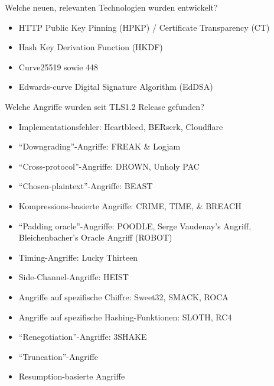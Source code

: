 \documentclass{f4_beamer_metropolis}
\begin{document}
\begin{frame}{Welche neuen, relevanten Technologien wurden entwickelt?}
  \begin{itemize}
    \item HTTP Public Key Pinning (HPKP) / Certificate Transparency (CT)
    \item Hash Key Derivation Function (HKDF)
    \item Curve25519 sowie 448
    \item Edwards-curve Digital Signature Algorithm (EdDSA)
  \end{itemize}

  \end{frame}

\begin{frame}{Welche Angriffe wurden seit TLS1.2 Release gefunden?}
  \begin{itemize}
    \item Implementationsfehler: Heartbleed, BERserk, Cloudflare
    \item \enquote{Downgrading}-Angriffe: FREAK \& Logjam
    \item \enquote{Cross-protocol}-Angriffe: DROWN, Unholy PAC
    \item \enquote{Chosen-plaintext}-Angriffe: BEAST
    \item Kompressions-basierte Angriffe: CRIME, TIME, \& BREACH
    \item \enquote{Padding oracle}-Angriffe: POODLE, Serge Vaudenay's Angriff, Bleichenbacher's Oracle Angriff (ROBOT)
    \item Timing-Angriffe: Lucky Thirteen
    \item Side-Channel-Angriffe: HEIST
    \item Angriffe auf spezifische Chiffre: Sweet32, SMACK, ROCA
    \item Angriffe auf spezifische Hashing-Funktionen: SLOTH, RC4
    \item \enquote{Renegotiation}-Angriffe: 3SHAKE
    \item \enquote{Truncation}-Angriffe
    \item Resumption-basierte Angriffe
  \end{itemize}

\end{frame}
\end{document}
